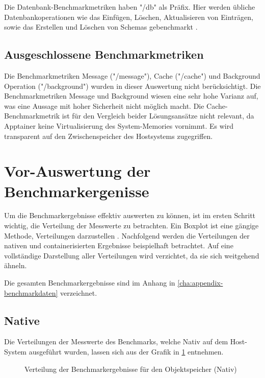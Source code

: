 Die Datenbank-Benchmarkmetriken haben "/db" als Präfix. Hier werden übliche Datenbankoperationen wie das Einfügen, Löschen, Aktualisieren von Einträgen, sowie das Erstellen und Löschen von Schemas gebenchmarkt \cite[Vgl. S. 718]{kuhnJULEAFlexibleStorage2017}.

\subsection{Ausgeschlossene Benchmarkmetriken}

Die Benchmarkmetriken Message ("/message"), Cache ("/cache") und Background Operation ("/background") wurden in dieser Auswertung nicht berücksichtigt. Die Benchmarkmetriken Message und Background wiesen eine sehr hohe Varianz auf, was eine Aussage mit hoher Sicherheit nicht möglich macht. Die Cache-Benchmarkmetrik ist für den Vergleich beider Lösungsansätze nicht relevant, da Apptainer keine Virtualisierung des System-Memories vornimmt. Es wird transparent auf den Zwischenspeicher des Hostsystems zugegriffen.   

\section{Vor-Auswertung der Benchmarkergenisse}

Um die Benchmarkergebnisse effektiv auswerten zu können, ist im ersten Schritt wichtig, die Verteilung der Messwerte zu betrachten. Ein Boxplot ist eine gängige Methode, Verteilungen darzustellen \cite[Vgl. S. 1]{majawExploringDataDistributions2023}. Nachfolgend werden die Verteilungen der nativen und containerisierten Ergebnisse beispielhaft betrachtet. Auf eine vollständige Darstellung aller Verteilungen wird verzichtet, da sie sich weitgehend ähneln.

Die gesamten Benchmarkergebnisse sind im Anhang in \cref{cha:appendix-benchmarkdaten} verzeichnet.

\pagebreak

\subsection{Native}

Die Verteilungen der Messwerte des Benchmarks, welche Nativ auf dem Host-System ausgeführt wurden, lassen sich aus der Grafik in \cref{fig:boxplot_object} entnehmen.

\begin{figure}[H]
    
    \caption{Verteilung der Benchmarkergebnisse für den Objektspeicher (Nativ)}
    \label{fig:boxplot_object}
\end{figure}
\FloatBarrier

